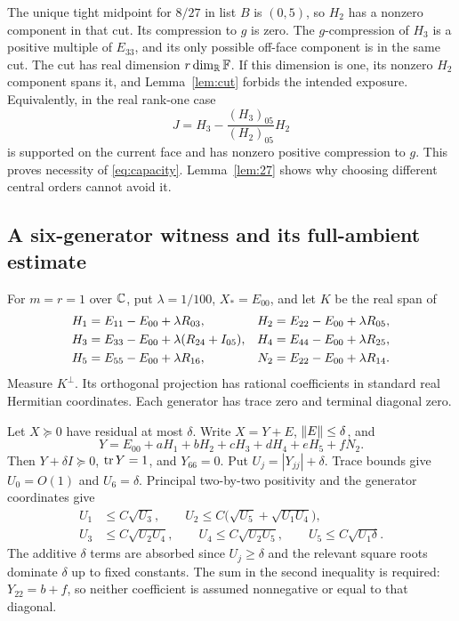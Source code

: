 The unique tight midpoint for $8/27$ in list $B$ is $(0,5)$, so $H_2$ has a nonzero component in that cut. Its compression to $g$ is zero. The $g$-compression of $H_3$ is a positive multiple of $E_{33}$, and its only possible off-face component is in the same cut. The cut has real dimension $r\dim_{\mathbb R}\mathbb F$. If this dimension is one, its nonzero $H_2$ component spans it, and Lemma~\ref{lem:cut} forbids the intended exposure. Equivalently, in the real rank-one case
\[
 J=H_3-\frac{(H_3)_{05}}{(H_2)_{05}}H_2
\]
is supported on the current face and has nonzero positive compression to $g$. This proves necessity of \eqref{eq:capacity}. Lemma~\ref{lem:27} shows why choosing different central orders cannot avoid it.

\subsection{A six-generator witness and its full-ambient estimate}
For $m=r=1$ over $\mathbb C$, put $\lambda=1/100$, $X_*=E_{00}$, and let $K$ be the real span of
\begin{align}
 H_1&=E_{11}-E_{00}+\lambda R_{03},&
 H_2&=E_{22}-E_{00}+\lambda R_{05},\notag\\
 H_3&=E_{33}-E_{00}+\lambda(R_{24}+I_{05}),&
 H_4&=E_{44}-E_{00}+\lambda R_{25},\label{eq:witness}\\
 H_5&=E_{55}-E_{00}+\lambda R_{16},&
 N_2&=E_{22}-E_{00}+\lambda R_{14}.\notag
\end{align}
Measure $K^\perp$. Its orthogonal projection has rational coefficients in standard real Hermitian coordinates. Each generator has trace zero and terminal diagonal zero.

Let $X\succeq0$ have residual at most $\delta$. Write $X=Y+E$, $\lVert E\rVert\le\delta$, and
\[
Y=E_{00}+aH_1+bH_2+cH_3+dH_4+eH_5+fN_2.
\]
Then $Y+\delta I\succeq0$, $\operatorname{tr} Y=1$, and $Y_{66}=0$. Put $U_j=|Y_{jj}|+\delta$. Trace bounds give $U_0=O(1)$ and $U_6=\delta$. Principal two-by-two positivity and the generator coordinates give
\begin{equation}\label{eq:witnessineq}
\begin{split}
U_1&\le C\sqrt{U_3},\qquad
U_2\le C\bigl(\sqrt{U_5}+\sqrt{U_1U_4}\bigr),\\
U_3&\le C\sqrt{U_2U_4},\qquad
U_4\le C\sqrt{U_2U_5},\qquad
U_5\le C\sqrt{U_1\delta}.
\end{split}
\end{equation}
The additive $\delta$ terms are absorbed since $U_j\ge\delta$ and the relevant square roots dominate $\delta$ up to fixed constants. The sum in the second inequality is required: $Y_{22}=b+f$, so neither coefficient is assumed nonnegative or equal to that diagonal.

